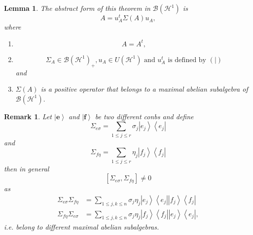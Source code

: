 \documentclass[aps,preprint]{revtex4}%
\newtheorem{lemma}[theorem]{Lemma}
\newtheorem{remark}[theorem]{Remark}
\begin{document}
\begin{lemma}
The abstract form of this theorem in $\mathcal{B}\left(  \mathcal{H}%
^{1}\right)  $ is
\begin{equation}
A=u_{A}^{t}\Sigma\left(  A\right)  u_{A},
\end{equation}
where

\begin{enumerate}
\item
\begin{equation}
A=A^{t},
\end{equation}


\item
\begin{equation}
\Sigma_{A}\in\mathcal{B}\left(  \mathcal{H}^{1}\right)  _{+},u_{A}\in U\left(
\mathcal{H}^{1}\right)  \text{ and }u_{A}^{t}\text{ is defined by }\left(
\left.  {}\right\vert \right)
\end{equation}
and

\item $\Sigma\left(  A\right)  $ is a positive operator that belongs to a
maximal abelian subalgebra of $\mathcal{B}\left(  \mathcal{H}^{1}\right)  .$
\end{enumerate}
\end{lemma}

\begin{remark}
Let $\left\vert \mathbf{e}\right\rangle $ and $\left\vert \mathbf{f}%
\right\rangle $ be two different conbs and define
\begin{equation}
\Sigma_{e\sigma}=\sum_{1\leq j\leq r}\sigma_{j}\left\vert e_{j}\right\rangle
\left\langle e_{j}\right\vert
\end{equation}
and
\begin{equation}
\Sigma_{f\eta}=\sum_{1\leq j\leq r}\eta_{j}\left\vert f_{j}\right\rangle
\left\langle f_{j}\right\vert
\end{equation}
then in general
\begin{equation}
\left[  \Sigma_{e\sigma},\Sigma_{f\eta}\right]  \neq0
\end{equation}
as
\begin{align}
\Sigma_{e\sigma}\Sigma_{f\eta}  &  =\sum_{1\leq j,k\leq n}\sigma_{j}\eta
_{j}\left\vert e_{j}\right\rangle \left\langle e_{j}\right\vert \left\vert
f_{j}\right\rangle \left\langle f_{j}\right\vert \\
\Sigma_{f\eta}\Sigma_{e\sigma}  &  =\sum_{1\leq j,k\leq n}\sigma_{j}\eta
_{j}\left\vert f_{j}\right\rangle \left\langle f_{j}\right\vert \left\vert
e_{j}\right\rangle \left\langle e_{j}\right\vert ,
\end{align}
i.e. \emph{belong to different maximal abelian subalgebras}.
\end{remark}
\end{document}
